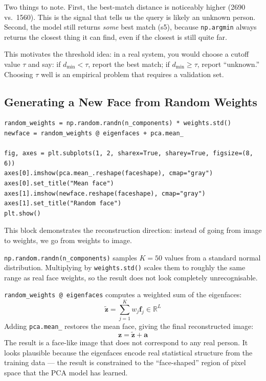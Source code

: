 \documentclass[12pt,a4paper]{article}
\begin{document}
Two things to note. First, the best-match distance is noticeably higher
(2690 vs.\ 1560). This is the signal that tells us the query is likely an
unknown person. Second, the model still returns \emph{some} best match (s5),
because \texttt{np.argmin} always returns the closest thing it can find,
even if the closest is still quite far.

This motivates the threshold idea: in a real system, you would choose a
cutoff value $\tau$ and say: if $d_{\min} < \tau$, report the best match;
if $d_{\min} \geq \tau$, report ``unknown.'' Choosing $\tau$ well is an
empirical problem that requires a validation set.

\subsection{Generating a New Face from Random Weights}

\vspace{0.5em}
\begin{minipage}{\linewidth}
\begin{lstlisting}[caption={Constructing a face from randomly sampled weights}]
random_weights = np.random.randn(n_components) * weights.std()
newface = random_weights @ eigenfaces + pca.mean_

fig, axes = plt.subplots(1, 2, sharex=True, sharey=True, figsize=(8, 6))
axes[0].imshow(pca.mean_.reshape(faceshape), cmap="gray")
axes[0].set_title("Mean face")
axes[1].imshow(newface.reshape(faceshape), cmap="gray")
axes[1].set_title("Random face")
plt.show()
\end{lstlisting}
\end{minipage}

This block demonstrates the reconstruction direction: instead of going from
image to weights, we go from weights to image.

\texttt{np.random.randn(n\_components)} samples $K = 50$ values from a
standard normal distribution. Multiplying by \texttt{weights.std()} scales
them to roughly the same range as real face weights, so the result does not
look completely unrecognisable.

\texttt{random\_weights @ eigenfaces} computes a weighted sum of the eigenfaces:
\[
\tilde{\mathbf{z}} = \sum_{j=1}^{K} w_j \mathbf{f}_j \in \mathbb{R}^{L}
\]
Adding \texttt{pca.mean\_} restores the mean face, giving the final
reconstructed image:
\[
\mathbf{z} = \tilde{\mathbf{z}} + \mathbf{a}
\]
The result is a face-like image that does not correspond to any real person.
It looks plausible because the eigenfaces encode real statistical structure
from the training data --- the result is constrained to the ``face-shaped''
region of pixel space that the PCA model has learned.
\end{document}
